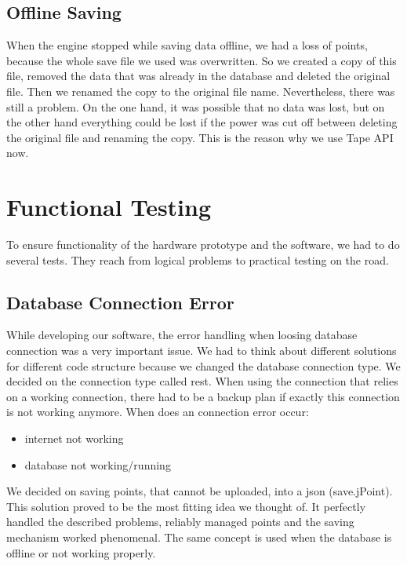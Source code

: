 \subsection{Offline Saving}
When the engine stopped while saving data offline, we had a loss of points, because the whole save file we used was overwritten. So we created a copy of this file, removed the data that was already in the database and deleted the original file. Then we renamed the copy to the original file name. Nevertheless, there was still a problem. On the one hand, it was possible that no data was lost, but on the other hand everything could be lost if the power was cut off between deleting the original file and renaming the copy. This is the reason why we use Tape API now. 
\section{Functional Testing}
To ensure functionality of the hardware prototype and the software, we had to do several tests. They reach from logical problems to practical testing on the road.
\subsection{Database Connection Error}
While developing our software, the error handling when loosing database connection was a very important issue. We had to think about different solutions for different code structure because we changed the database connection type. 
\newline \newline
We decided on the connection type called \gls{rest}. When using the connection that relies on a working connection, there had to be a backup plan if exactly this connection is not working anymore.
\newline \newline
When does an connection error occur:
\begin{itemize}
\item internet not working
\item database not working/running
\end{itemize}
We decided on saving points, that cannot be uploaded, into a \gls{json} (save.jPoint). This solution proved to be the most fitting idea we thought of. It perfectly handled the described problems, reliably managed points and the saving mechanism worked phenomenal.
\newline \newline
The same concept is used when the database is offline or not working properly. 
